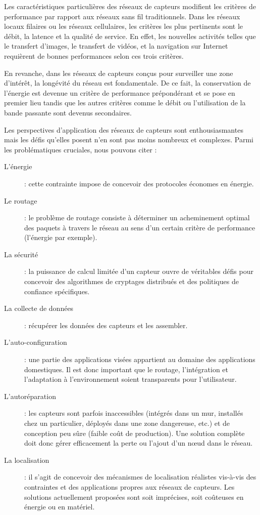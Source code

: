 Les caractéristiques particulières des réseaux de capteurs modifient les critères de performance par rapport aux réseaux sans fil traditionnels. Dans les réseaux locaux filaires ou les réseaux cellulaires, les critères les plus pertinents sont le débit, la latence et la qualité de service. En effet, les nouvelles activités telles que le transfert d’images,  le  transfert de vidéos, et la navigation sur Internet requièrent de bonnes performances selon ces trois critères.

En revanche, dans les réseaux de capteurs conçus pour surveiller une zone d’intérêt,  la longévité du réseau est fondamentale. De ce fait, la conservation de l’énergie est devenue un critère de performance prépondérant et se pose en premier lieu tandis que les autres critères comme le débit ou l’utilisation de la bande passante sont devenus secondaires.

Les perspectives d’application des réseaux de capteurs sont enthousiasmantes mais les défis qu’elles posent n’en sont pas moins nombreux et complexes. Parmi les problématiques cruciales, nous pouvons citer :

\begin{description}
\item[L’énergie] : cette contrainte impose de concevoir des protocoles économes en énergie.

\item[Le routage] : le problème de routage consiste à déterminer un acheminement optimal des paquets à travers le réseau au sens d’un certain critère de performance (l'énergie par exemple).

\item[La sécurité] : la puissance de calcul limitée d’un capteur ouvre de véritables défis pour concevoir des algorithmes de cryptages distribués et des politiques de confiance spécifiques.

\item[La collecte de données] : récupérer les données des capteurs et les assembler.

\item[L'auto-configuration] : une partie des applications visées appartient au domaine des applications domestiques. Il est donc important que le routage, l’intégration et l’adaptation à l’environnement soient transparents pour l’utilisateur.

\item[L'autoréparation] : les capteurs sont parfois inaccessibles (intégrés dans un mur, installés chez un particulier, déployés dans une zone dangereuse, etc.) et de conception peu sûre (faible coût de production). Une solution complète doit donc gérer efficacement la perte ou l’ajout d’un nœud dans le réseau.

\item[La localisation] : il s’agit de concevoir des mécanismes de localisation réalistes vis-à-vis des contraintes et des applications propres aux réseaux de capteurs. Les solutions actuellement proposées sont soit imprécises, soit coûteuses en énergie ou en matériel.
\end{description}


